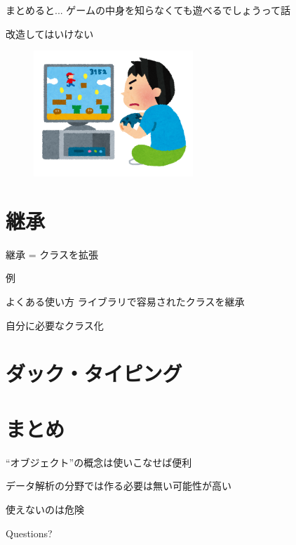 \documentclass[12pt, xetex, xcolor=pdftex, dvipsnames]{beamer}
\begin{document}
\begin{frame}{まとめると...}
    ゲームの中身を知らなくても遊べるでしょうって話

    改造してはいけない
    \begin{figure}
        \centering
        \includegraphics[width=6cm]{./img/videogame_boy.png}
    \end{figure}
\end{frame}

\section{継承}
{
    \begin{frame}{継承 = クラスを拡張}
    \end{frame}
}
\begin{frame}[fragile]{例}
    
\end{frame}
\begin{frame}{よくある使い方}
    ライブラリで容易されたクラスを継承

    自分に必要なクラス化
\end{frame}

\section{ダック・タイピング}

\section{まとめ}
\begin{frame}
    ``オブジェクト''の概念は使いこなせば便利

    データ解析の分野では作る必要は無い可能性が高い

    使えないのは危険
\end{frame}
\begin{frame}[standout]
  Questions?
\end{frame}
\end{document}
